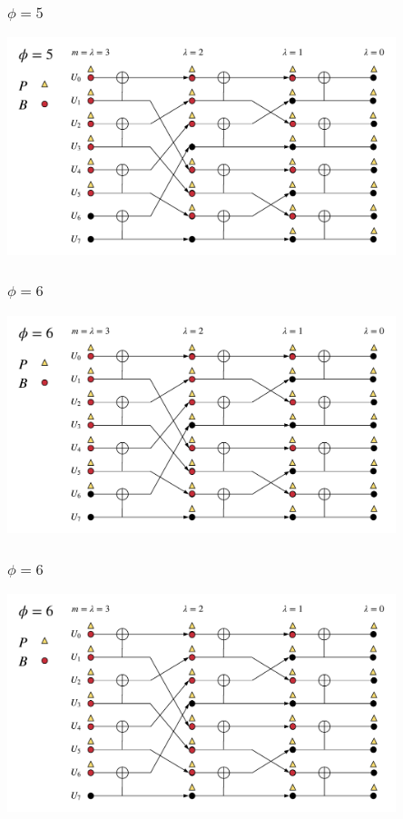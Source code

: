 \documentclass{beamer}
\begin{document}
\begin{frame}
\frametitle{$\phi=5$}
  \begin{center}
  \includegraphics[width=0.85\textwidth]{scl_pics/UpdateB_5.png}
  \end{center}
\end{frame}

\begin{frame}
\frametitle{$\phi=6$}
  \begin{center}
  \includegraphics[width=0.85\textwidth]{scl_pics/CalcP_6.png}
  \end{center}
\end{frame}

\begin{frame}
\frametitle{$\phi=6$}
  \begin{center}
  \includegraphics[width=0.85\textwidth]{scl_pics/UpdateB_6.png}
  \end{center}
\end{frame}
\end{document}
